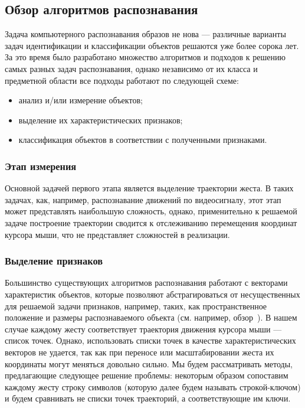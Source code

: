 \documentclass[a5paper]{article}
\begin{document}
\subsection{Обзор алгоритмов распознавания}
Задача компьютерного распознавания образов не нова --- различные варианты задач идентификации и классификации объектов решаются уже более сорока лет. За это время было разработано множество алгоритмов и подходов к решению самых разных задач распознавания, однако независимо от их класса и предметной области все подходы работают по следующей схеме: 
\begin{itemize}
  \item анализ и/или измерение объектов;
  \item выделение их характеристических признаков;
  \item классификация объектов в соответствии с полученными признаками.
\end{itemize}

\subsubsection{Этап измерения}
Основной задачей первого этапа является выделение траектории жеста. В таких задачах, как, например, распознавание движений по видеосигналу, этот этап может представлять наибольшую сложность, однако, применительно к решаемой задаче построение траектории сводится к отслеживанию перемещения координат курсора мыши, что не представляет сложностей в реализации. 

\subsubsection{Выделение признаков}
Большинство существующих алгоритмов распознавания работают с векторами характеристик объектов, которые позволяют абстрагироваться от несущественных для решаемой задачи признаков, например, таких, как пространственное положение и размеры распознаваемого объекта (см. например, обзор~\cite{handRecognition}). В нашем случае каждому жесту соответствует траектория движения курсора мыши --- список точек. Однако, использовать списки точек в качестве характеристических векторов не удается, так как при переносе или масштабировании жеста их координаты могут меняться довольно сильно. Мы будем рассматривать методы, предлагающие следующее решение проблемы: некоторым образом сопоставим каждому жесту строку символов (которую далее будем называть строкой-ключом) и будем сравнивать не списки точек траекторий, а соответствующие им ключи.
\end{document}
